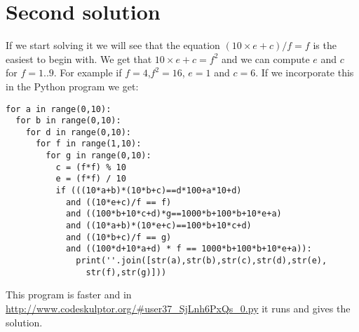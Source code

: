 \documentclass{article}
\begin{document}
\section{Second solution}
If we start solving it we will see that the equation $(10\times e+c)/f=f$ is the easiest to begin with. We get that $10\times e+c=f^2$ and we can compute $e$ and $c$ for $f=1..9$. For example if $f=4$,$f^2=16$,
$e=1$ and $c=6$.
If we incorporate this in the Python program we get:
\begin{lstlisting}
for a in range(0,10):
  for b in range(0,10):
    for d in range(0,10):
      for f in range(1,10):
        for g in range(0,10):
          c = (f*f) % 10
          e = (f*f) / 10
          if (((10*a+b)*(10*b+c)==d*100+a*10+d)
            and ((10*e+c)/f == f) 
            and ((100*b+10*c+d)*g==1000*b+100*b+10*e+a)
            and ((10*a+b)*(10*e+c)==100*b+10*c+d)
            and ((10*b+c)/f == g) 
            and ((100*d+10*a+d) * f == 1000*b+100*b+10*e+a)):
              print(''.join([str(a),str(b),str(c),str(d),str(e),
                str(f),str(g)]))
\end{lstlisting}
This program is faster and in \url{http://www.codeskulptor.org/#user37_SjLnh6PxQs_0.py} it runs and gives the solution.
\end{document}

